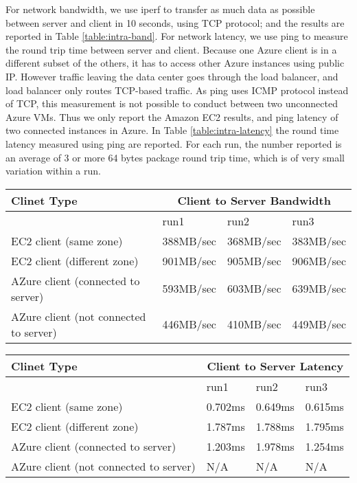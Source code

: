 For network bandwidth, we use iperf to transfer as much data as possible between server and client in 10 seconds, using TCP protocol; and the results are reported in Table \ref{table:intra-band}. For network latency, we use ping to measure the round trip time between server and client. Because one Azure client is in a different subset of the others, it has to access other Azure instances using public IP. However traffic leaving the data center goes through the load balancer, and load balancer only routes TCP-based traffic. As ping uses ICMP protocol instead of TCP, this measurement is not possible to conduct between two unconnected Azure VMs. Thus we only report the Amazon EC2 results, and ping latency of two connected instances in Azure. In Table \ref{table:intra-latency} the round time latency measured using ping are reported. For each run, the number reported is an average of 3 or more 64 bytes package round trip time, which is of very small variation within a run.

\begin{table*}
\center
  \begin{tabular}{| l | l | l | l |}
\hline
Clinet Type & \multicolumn{3}{|c|}{Client to Server Bandwidth} \\
\hline      
& run1 & run2 & run3 \\
\hline
EC2 client (same zone) & 388MB/sec & 368MB/sec & 383MB/sec \\
EC2 client (different zone) & 901MB/sec & 905MB/sec & 906MB/sec \\
AZure client (connected to server) & 593MB/sec & 603MB/sec & 639MB/sec \\
AZure client (not connected to server) & 446MB/sec & 410MB/sec & 449MB/sec \\ 
\hline
\end{tabular}
\caption{Intra-cloud network bandwidth measurement}
\label{table:intra-band}
\end{table*}


\begin{table*}
\center
  \begin{tabular}{| l | l | l | l |}
\hline
Clinet Type & \multicolumn{3}{|c|}{Client to Server Latency} \\
\hline
& run1 & run2 & run3 \\
\hline
EC2 client (same zone) & 0.702ms & 0.649ms & 0.615ms \\
EC2 client (different zone) & 1.787ms & 1.788ms & 1.795ms \\
AZure client (connected to server) & 1.203ms & 1.978ms & 1.254ms \\
AZure client (not connected to server) & N/A & N/A & N/A \\ 
\hline
\end{tabular}
\caption{Intra-cloud network latency measurement}
\label{table:intra-latency}
\end{table*}

